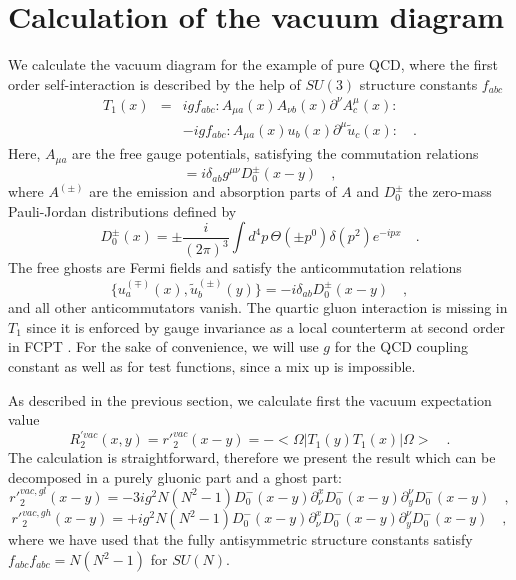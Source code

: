 \documentclass[a4paper,11pt]{article}
\begin{document}
\section{Calculation of the vacuum diagram}
We calculate the vacuum diagram for the example of pure QCD,
where the first order self-interaction is described by the
help of $SU(3)$ structure constants $f_{abc}$
\begin{eqnarray}
T_1(x)&=&igf_{abc}:A_{\mu a}(x) A_{\nu b}(x) \partial^\nu A^\mu_c(x): \nonumber
\\
& & -igf_{abc}:A_{\mu a}(x) u_b(x) \partial^\mu \tilde{u}_c(x): \quad .
\end{eqnarray}
Here, $A_{\mu a}$ are the free gauge potentials, satisfying the
commutation relations
\begin{equation}
[A_a^{\mu(\mp)}(x),A_b^{\nu(\pm)}(y)]=i\delta_{ab}g^{\mu \nu} D_0^{\pm}(x-y)
\quad ,
\end{equation}
where $A^{(\pm)}$ are the emission and absorption parts of $A$ and
$D_0^{\pm}$ the zero-mass Pauli-Jordan distributions defined by
\begin{equation}
D_0^{\pm}(x)=\pm \frac{i}{(2 \pi)^3} \int d^4 p \, \Theta(\pm p^0)
\delta(p^2) e^{-ipx} \quad .
\end{equation}
The free ghosts are Fermi fields and satisfy the anticommutation relations
\begin{equation}
\{u_a^{(\mp)}(x),\tilde{u}_b^{(\pm)}(y) \} = -i \delta_{ab}
D_0^{\pm}(x-y) \quad ,
\end{equation}
and all other anticommutators vanish. 
The quartic gluon interaction is missing in $T_1$ since it is enforced
by gauge invariance as a local counterterm at second order
in FCPT \cite{appl1}.
For the sake of convenience, we will use $g$ for the QCD coupling constant
as well as for test functions, since a mix up is impossible.

As described in the previous section,  we
calculate first the vacuum expectation value
\begin{equation}
R_2^{'vac}(x,y)=r'^{vac}_2(x-y)=-<\Omega | T_1(y)T_1(x) | \Omega> \quad.
\end{equation}
The calculation is straightforward, therefore we present the result
which can be decomposed in a purely gluonic part and a ghost part:
\begin{equation}
r'^{vac,gl}_2(x-y)=-3ig^2N(N^2-1)D_0^-(x-y) \partial_\nu^x D_0^-(x-y)
\partial_y^\nu D_0^-(x-y) \quad ,
\end{equation}
\begin{equation}
r'^{vac,gh}_2(x-y)=+ig^2N(N^2-1)D_0^-(x-y) \partial_\nu^x D_0^-(x-y)
\partial_y^\nu D_0^-(x-y) \quad ,
\end{equation}
where we have used that the fully antisymmetric structure constants satisfy
$f_{abc}f_{abc}=N(N^2-1)$ for $SU(N)$.
\end{document}
